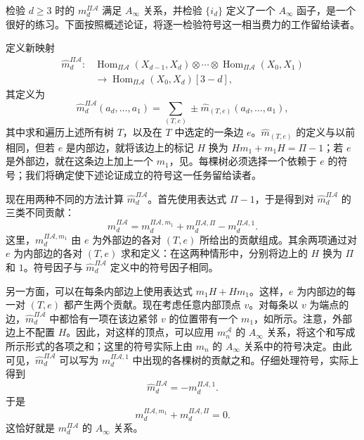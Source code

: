 检验 $d\geq3$ 时的 $m_d^{\Pi\mathcal A}$ 满足 $A_\infty$ 关系，并检验 $\{i_d\}$ 定义了一个 $A_\infty$ 函子，是一个很好的练习。下面按照概述论证，将逐一检验符号这一相当费力的工作留给读者。

定义新映射
\[
\begin{aligned}
\widehat m_d^{\Pi\mathcal A}\colon{}&
\operatorname{Hom}_{\Pi\mathcal A}(X_{d-1},X_d)
\otimes\cdots\otimes
\operatorname{Hom}_{\Pi\mathcal A}(X_0,X_1)\\
&\longrightarrow\operatorname{Hom}_{\Pi\mathcal A}(X_0,X_d)[3-d],
\end{aligned}
\]
其定义为
\[
\widehat m_d^{\Pi\mathcal A}(a_d,\ldots,a_1)
=\sum_{(T,e)}\pm\widehat m_{(T,e)}(a_d,\ldots,a_1),
\]
其中求和遍历上述所有树 $T$，以及在 $T$ 中选定的一条边 $e$。$\widehat m_{(T,e)}$ 的定义与以前相同，但若 $e$ 是内部边，就将该边上的标记 $H$ 换为 $Hm_1+m_1H=\Pi-1$；若 $e$ 是外部边，就在这条边上加上一个 $m_1$，见。每棵树必须选择一个依赖于 $e$ 的符号；我们将确定使下述论证成立的符号这一任务留给读者。

\begin{figure}[H]
\centering
{}
\BookNumberOnlyCaption\label{fig:8.11}
\end{figure}

现在用两种不同的方法计算 $\widehat m_d^{\Pi\mathcal A}$。首先使用表达式 $\Pi-1$，于是得到对 $\widehat m_d^{\Pi\mathcal A}$ 的三类不同贡献：
\[
\widehat m_d^{\Pi\mathcal A}
=m_d^{\Pi\mathcal A,m_1}
+m_d^{\Pi\mathcal A,\Pi}
-m_d^{\Pi\mathcal A,1}.
\]
这里，$m_d^{\Pi\mathcal A,m_1}$ 由 $e$ 为外部边的各对 $(T,e)$ 所给出的贡献组成。其余两项通过对 $e$ 为内部边的各对 $(T,e)$ 求和定义：在这两种情形中，分别将边上的 $H$ 换为 $\Pi$ 和 $1$。符号因子与 $\widehat m_d^{\Pi\mathcal A}$ 定义中的符号因子相同。

另一方面，可以在每条内部边上使用表达式 $m_1H+Hm_1$。这样，$e$ 为内部边的每一对 $(T,e)$ 都产生两个贡献。现在考虑任意内部顶点 $v$。对每条以 $v$ 为端点的边，$\widehat m_d^{\Pi\mathcal A}$ 中都恰有一项在该边紧邻 $v$ 的位置带有一个 $m_1$，如所示。注意，外部边上不配置 $H$。因此，对这样的顶点，可以应用 $m_n^{\mathcal A}$ 的 $A_\infty$ 关系，将这个和写成所示形式的各项之和；这里的符号实际上由 $m_n$ 的 $A_\infty$ 关系中的符号决定。由此可见，$\widehat m_d^{\Pi\mathcal A}$ 可以写为 $m_d^{\Pi\mathcal A,1}$ 中出现的各棵树的贡献之和。仔细处理符号，实际上得到
\[
\widehat m_d^{\Pi\mathcal A}=-m_d^{\Pi\mathcal A,1}.
\]
于是
\[
m_d^{\Pi\mathcal A,m_1}+m_d^{\Pi\mathcal A,\Pi}=0.
\]
这恰好就是 $m_d^{\Pi\mathcal A}$ 的 $A_\infty$ 关系。

